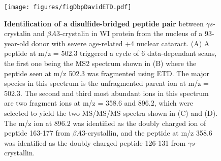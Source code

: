 \documentclass[arial,11pt]{article}
\begin{document}
\begin{figure}[htb!]
    \centering
    \texttt{[image: figures/figDbpDavidETD.pdf]}
  \caption{\footnotesize {\bf Identification of a disulfide-bridged peptide pair} between $\gamma s$-crystalin and $\beta A3$-crystalin in WI protein from the nucleus of a 93-year-old donor with severe age-related +4 nuclear cataract.  %
  (A) A peptide at m/z = 502.3 triggered a cycle of 6 data-dependant scans, the first one being the MS2 spectrum shown in (B) where the peptide seen at m/z 502.3 was fragmented using ETD.  The major species in this spectrum is the unfragmented parent ion at m/z = 502.3. %
  The second and third most abundant ions in this spectrum are two fragment ions at m/z = 358.6 and 896.2, which were selected %
  to yield the two MS/MS/MS spectra shown in (C) and (D).  The m/z ion at 896.2 was identified as the doubly charged ion of peptide 163-177 from $\beta A3$-crystallin, and the peptide at m/z 358.6 was identified as the doubly charged peptide 126-131 from $\gamma s$-crystallin.  %
  }
  \label{fig.dbp.david.etd}
\end{figure}
\end{document}

